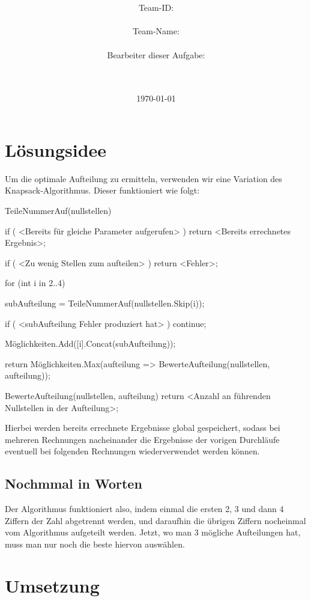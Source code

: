 \documentclass[a4paper,10pt,ngerman]{scrartcl}
\title{\textbf{\Huge\Aufgabe}}
\author{\LARGE Team-ID: \LARGE \TeamID \\\\
	    \LARGE Team-Name: \LARGE \TeamName \\\\
	    \LARGE Bearbeiter dieser Aufgabe: \\ 
	    \LARGE \Namen\\\\}
\date{\LARGE\today}
\begin{document}
\maketitle
\tableofcontents

\section{Lösungsidee} \label{idea}

Um die optimale Aufteilung zu ermitteln,
verwenden wir eine Variation des Knapsack-Algorithmus.
Dieser funktioniert wie folgt:

\begin{lstcs}
TeileNummerAuf(nullstellen) {
    if ( <Bereits für gleiche Parameter aufgerufen> ) {
        return <Bereits errechnetes Ergebnis>;
    }
    
    if ( <Zu wenig Stellen zum aufteilen> ) {
    	return <Fehler>;
    }

    for (int i in 2..4) {
        subAufteilung = TeileNummerAuf(nullstellen.Skip(i));

		    if ( <subAufteilung Fehler produziert hat> ) continue;
		
        Möglichkeiten.Add([i].Concat(subAufteilung));
    }

    return Möglichkeiten.Max(aufteilung => BewerteAufteilung(nullstellen, aufteilung));
}

BewerteAufteilung(nullstellen, aufteilung) {
    return <Anzahl an führenden Nullstellen in der Aufteilung>;
}
\end{lstcs}

Hierbei werden bereits errechnete Ergebnisse global gespeichert,
sodass bei mehreren Rechnungen nacheinander die Ergebnisse der vorigen
Durchläufe eventuell bei folgenden Rechnungen wiederverwendet werden können.

\subsection{Nochmmal in Worten}

Der Algorithmus funktioniert also, indem einmal die ersten 2, 3 und dann 4
Ziffern der Zahl abgetrennt werden, und daraufhin die übrigen Ziffern
nocheinmal vom Algorithmus aufgeteilt werden.
Jetzt, wo man 3 mögliche Aufteilungen hat, muss man nur noch die beste
hiervon auswählen.

\section{Umsetzung}
\end{document}
